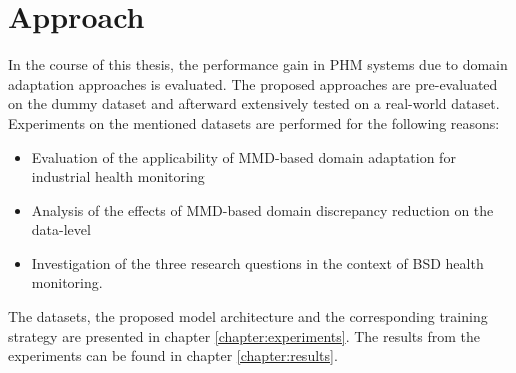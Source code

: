 \section{Approach}
In the course of this thesis, the performance gain in PHM systems due to domain adaptation approaches is evaluated. The proposed approaches are pre-evaluated on the dummy dataset and afterward extensively tested on a real-world dataset. Experiments on the mentioned datasets are performed for the following reasons:
\begin{itemize}
    \item Evaluation of the applicability of MMD-based domain adaptation for industrial health monitoring
    \item Analysis of the effects of MMD-based domain discrepancy reduction on the data-level
    \item Investigation of the three research questions in the context of BSD health monitoring.
\end{itemize}

The datasets, the proposed model architecture and the corresponding training strategy are presented in chapter \ref{chapter:experiments}. The results from the experiments can be found in chapter \ref{chapter:results}. 
\begin{comment}
\section{Signals used for PHM}
In the work of Pandhare et al. \cite{Pandhare2021} just vibration signals in different spatial directions are measured with sensors, installed at various locations on the BSD. Azamfar et al. \cite{AZAMFAR2020103932} additionally use sound pressure sensors to capture the acoustic level and extract torque and speed signals from the controller. In this thesis also the mechanical power, target electrical power and actual electrical power signals were extracted from the controller. Pandhare et al. and Azamfar et al. record machine data during BSD steady-state motion. In this thesis machine data is collected during different machine excitements (constant speed excitements, direction change excitements and sweep excitement) along the machine tools X-axis. These different signals were evaluated for their suitability for PHM of BSDs


Both Pandhare et al. \cite{Pandhare2021} and Azamfar et al. \cite{AZAMFAR2020103932} feed the data recorded during BSD steady-state motion as one single input to their models. During the phases of constant BSD motion, the amplitude of the signals changess. Azamfar et al. assume that the shorter sequences created by a windowing function just capture limited information about these changes and are therefore not a proper tool for PHM \cite{AZAMFAR2020103932}. In the thesis a windowing function was evaluated for the PHM of BSDs. Windowing functions make the BSD experiments less dependent from specific BSD excitements. When beeing able to check the BSD degradation with short recorded windows, one can make statements about the BSD health status with data redcorded in real time use. Extra experiments 
\end{comment}


